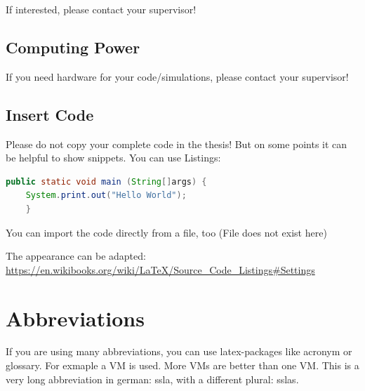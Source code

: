 	If interested, please contact your supervisor!
	
	\subsection{Computing Power}
	If you need hardware for your code/simulations, please contact your supervisor!
	
	
	\subsection{Insert Code } Please do not copy your complete code in the thesis! But on some points it can be helpful to show snippets. You can use Listings:
	
	\begin{lstlisting}[language=java, caption=Hello World in Java, label=helloJava]
	public static void main (String[]args) {
	System.print.out("Hello World");
	}
	\end{lstlisting}
	
	You can import the code directly from a file, too (File does not exist here)
	
	The appearance can be adapted: \url{https://en.wikibooks.org/wiki/LaTeX/Source_Code_Listings#Settings}
	
	\section{Abbreviations}
	If you are using many abbreviations, you can use latex-packages like acronym or glossary. For exmaple a \ac{VM} is used. More \acp{VM} are better than one \ac{VM}.
	This is a very long abbreviation in german: \ac{ssla}, with a different plural: \acp{ssla}.
	

